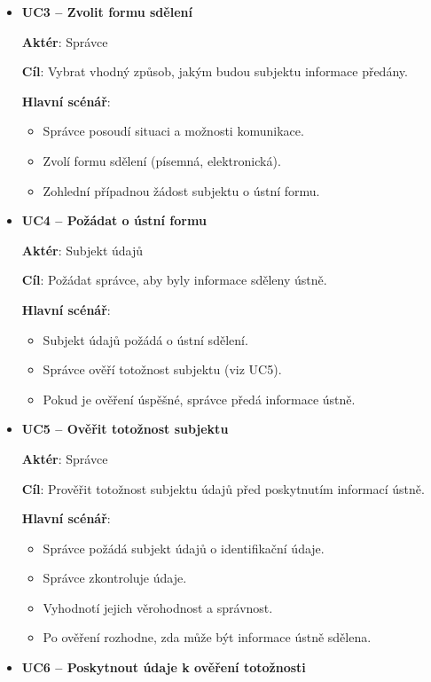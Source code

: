 \begin{itemize}
\begin{itemize}
    \item \textbf{UC3 – Zvolit formu sdělení}

    \textbf{Aktér}: Správce

    \textbf{Cíl}: Vybrat vhodný způsob, jakým budou subjektu informace předány.

    \textbf{Hlavní scénář}:
    \begin{itemize}
        \item Správce posoudí situaci a možnosti komunikace.
        \item Zvolí formu sdělení (písemná, elektronická).
        \item Zohlední případnou žádost subjektu o ústní formu.
    \end{itemize}

    \item \textbf{UC4 – Požádat o ústní formu}

    \textbf{Aktér}: Subjekt údajů

    \textbf{Cíl}: Požádat správce, aby byly informace sděleny ústně.

    \textbf{Hlavní scénář}:
    \begin{itemize}
        \item Subjekt údajů požádá o ústní sdělení.
        \item Správce ověří totožnost subjektu (viz UC5).
        \item Pokud je ověření úspěšné, správce předá informace ústně.
    \end{itemize}

    \item \textbf{UC5 – Ověřit totožnost subjektu}

    \textbf{Aktér}: Správce

    \textbf{Cíl}: Prověřit totožnost subjektu údajů před poskytnutím informací ústně.

    \textbf{Hlavní scénář}:
    \begin{itemize}
        \item Správce požádá subjekt údajů o identifikační údaje.
        \item Správce zkontroluje údaje.
        \item Vyhodnotí jejich věrohodnost a správnost.
        \item Po ověření rozhodne, zda může být informace ústně sdělena.
    \end{itemize}

    \item \textbf{UC6 – Poskytnout údaje k ověření totožnosti}


\end{itemize}
\end{itemize}
